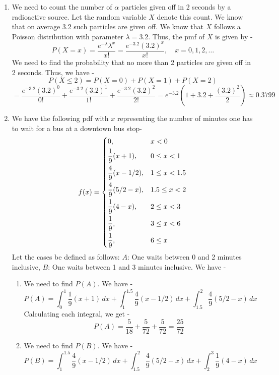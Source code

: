 \begin{enumerate}
\begin{enumerate}
    Therefore the maximum number is
    \[
    \boxed{\,n_{\max}=1\, }.
    \]
\end{enumerate}
    \item We need to count the number of $\alpha$ particles given off in 2 seconds by a radioactive source. Let the random variable $X$ denote this count. We know that on average 3.2 such particles are given off. We know that $X$ follows a Poisson distribution with parameter $\lambda = 3.2$. Thus, the pmf of $X$ is given by -
    $$P(X = x) = \frac{e^{-\lambda} \lambda^x}{x!} = \frac{e^{-3.2} (3.2)^x}{x!}, \quad x = 0, 1, 2, \ldots$$
    We need to find the probability that no more than 2 particles are given off in 2 seconds. Thus, we have -
    \[P(X \leq 2) = P(X=0) + P(X=1) + P(X=2)\]
    \[\boxed{= \frac{e^{-3.2} (3.2)^0}{0!} + \frac{e^{-3.2} (3.2)^1}{1!} + \frac{e^{-3.2} (3.2)^2}{2!} = e^{-3.2} \left(1 + 3.2 + \frac{(3.2)^2}{2}\right) \approx 0.3799}
    \]
    \item We have the following pdf with $x$ representing the number of minutes one has to wait for a bus at a downtown bus stop- \\
    $$f(x) = \begin{dcases}
        0, & x < 0 \\
        \frac{1}{9}(x+1), & 0 \leq x < 1 \\
        \frac{4}{9}(x - 1/2), & 1 \leq x < 1.5 \\
        \frac{4}{9}(5/2 - x), & 1.5 \leq x < 2 \\
        \frac{1}{9}(4-x), & 2 \leq x < 3 \\
        \frac{1}{9}, & 3 \leq x < 6 \\
        \frac{1}{9}, & 6 \leq x \\
        \end{dcases}
$$
Let the cases be defined as follows:
$A$: One waits between 0 and 2 minutes inclusive, $B$: One waits between 1 and 3 minutes inclusive. We have -
\begin{enumerate}
    \item We need to find $P(A)$. We have -
    \[P(A) = \int_{0}^{1} \frac{1}{9}(x+1) \, dx + \int_{1}^{1.5} \frac{4}{9}(x - 1/2) \, dx + \int_{1.5}^{2} \frac{4}{9}(5/2 - x) \, dx\]
    Calculating each integral, we get -
    \[\boxed{P(A) = \frac{5}{18} + \frac{5}{72} + \frac{5}{72} = \frac{25}{72}
    }\]
    \item We need to find $P(B)$. We have -
    \[P(B) = \int_{1}^{1.5} \frac{4}{9}(x - 1/2) \, dx + \int_{1.5}^{2} \frac{4}{9}(5/2 - x) \, dx + \int_{2}^{3} \frac{1}{9}(4-x) \, dx\]

\end{enumerate}
\end{enumerate}
